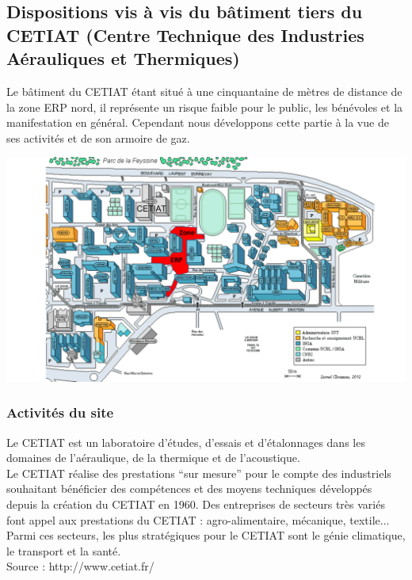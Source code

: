 \documentclass[hidelinks, paper=a4, fontsize=13pt]{report}
\begin{document}
\subsection{Dispositions vis à vis du bâtiment tiers du CETIAT (Centre Technique des Industries Aérauliques et Thermiques)}

Le bâtiment du CETIAT étant situé à une cinquantaine de mètres de distance de la zone ERP nord, il représente un risque faible pour le public, les bénévoles et la manifestation en général. Cependant nous développons cette partie à la vue de ses activités et de son armoire de gaz. 

\begin{center}
	\includegraphics[scale=0.9]{Annexes/Plans/Emplacement_CETIAT}
\end{center}

\subsubsection{Activités du site}

Le CETIAT est un laboratoire d'études, d'essais et d'étalonnages dans les domaines de l'aéraulique, de la thermique et de l'acoustique. \\

Le CETIAT réalise des prestations “sur mesure” pour le compte des industriels souhaitant bénéficier des compétences et des moyens techniques développés depuis la création du CETIAT en 1960. Des entreprises de secteurs très variés font appel aux prestations du CETIAT : agro-alimentaire, mécanique, textile... Parmi ces secteurs, les plus stratégiques pour le CETIAT sont le génie climatique, le transport et la santé.\\

Source : http://www.cetiat.fr/
\end{document}
